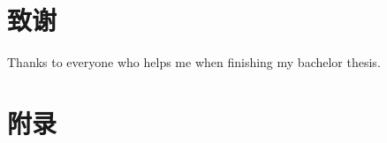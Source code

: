 \documentclass[a4paper,AutoFakeBold,oneside,12pt]{book}
\begin{document}
\blankmatter


\blankmatter




\frontmatter
\tableofcontents

\newpage
\mainmatter
{}



\clearpage
{}

\songti{}

\clearpage
\chapter*{致\qquad{}谢}

Thanks to everyone who helps me when finishing my bachelor thesis.

\setcounter{figure}{0} 
\renewcommand{\thefigure}{~附-\arabic{figure}~}
\setcounter{equation}{0} 
\renewcommand{\theequation}{~附-\arabic{equation}~}
\setcounter{table}{0} 
\renewcommand{\thetable}{~附-\arabic{table}~}
\setcounter{lstlisting}{0} 
\makeatletter
  \renewcommand \thelstlisting
       {附-\@arabic\c@lstlisting}
\makeatother

\chapter*{附\qquad{}录}


\end{document}
